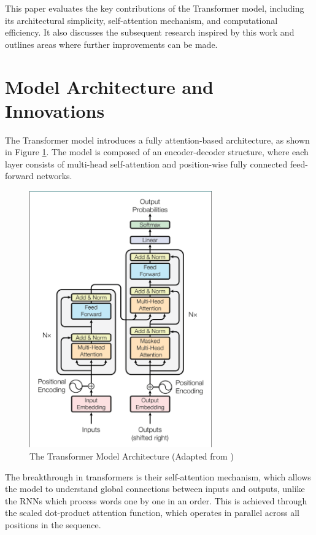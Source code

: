 \documentclass[runningheads]{llncs}
\begin{document}
This paper evaluates the key contributions of the Transformer model, including its architectural simplicity, self-attention mechanism, and computational efficiency. It also discusses the subsequent research inspired by this work and outlines areas where further improvements can be made.


\section{Model Architecture and Innovations}
The Transformer model introduces a fully attention-based architecture, as shown in Figure \ref{fig:transformer_architecture}. The model is composed of an encoder-decoder structure, where each layer consists of multi-head self-attention and position-wise fully connected feed-forward networks.

\begin{figure}
    \centering
    \includegraphics[width=0.7\textwidth]{transformer_Archi.png}
    \caption{The Transformer Model Architecture (Adapted from \cite{vaswani2017attention})}
    \label{fig:transformer_architecture}
\end{figure}

The breakthrough in transformers is their self-attention mechanism, which allows the model to understand global connections between inputs and outputs, unlike the RNNs which process words one by one in an order. This is achieved through the scaled dot-product attention function, which operates in parallel across all positions in the sequence.
\end{document}
